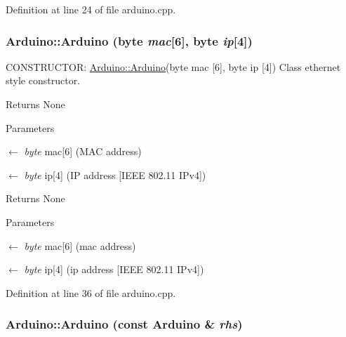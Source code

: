 Definition at line 24 of file arduino.cpp.\hypertarget{classArduino_af946ad1ba77bc602ee8e69923fb06e2d_af946ad1ba77bc602ee8e69923fb06e2d}{
\subsubsection[{Arduino}]{\setlength{\rightskip}{0pt plus 5cm}Arduino::Arduino (byte {\em mac}\mbox{[}6\mbox{]}, \/  byte {\em ip}\mbox{[}4\mbox{]})}}
\label{classArduino_af946ad1ba77bc602ee8e69923fb06e2d_af946ad1ba77bc602ee8e69923fb06e2d}


CONSTRUCTOR: \hyperlink{classArduino_a625b4d718e488c7a7c13593b8abf9a43_a625b4d718e488c7a7c13593b8abf9a43}{Arduino::Arduino}(byte mac \mbox{[}6\mbox{]}, byte ip \mbox{[}4\mbox{]}) Class ethernet style constructor. \begin{DoxyReturn}{Returns}
None 
\end{DoxyReturn}

\begin{DoxyParams}{Parameters}
\item[\mbox{$\leftarrow$} {\em byte}]mac\mbox{[}6\mbox{]} (MAC address) \item[\mbox{$\leftarrow$} {\em byte}]ip\mbox{[}4\mbox{]} (IP address \mbox{[}IEEE 802.11 IPv4\mbox{]})\end{DoxyParams}
\begin{DoxyReturn}{Returns}
None 
\end{DoxyReturn}

\begin{DoxyParams}{Parameters}
\item[\mbox{$\leftarrow$} {\em byte}]mac\mbox{[}6\mbox{]} (mac address) \item[\mbox{$\leftarrow$} {\em byte}]ip\mbox{[}4\mbox{]} (ip address \mbox{[}IEEE 802.11 IPv4\mbox{]}) \end{DoxyParams}


Definition at line 36 of file arduino.cpp.\hypertarget{classArduino_abb555c50c1812b3b81211ffc490ff70f_abb555c50c1812b3b81211ffc490ff70f}{
\subsubsection[{Arduino}]{\setlength{\rightskip}{0pt plus 5cm}Arduino::Arduino (const {\bf Arduino} \& {\em rhs})}}
\label{classArduino_abb555c50c1812b3b81211ffc490ff70f_abb555c50c1812b3b81211ffc490ff70f}


